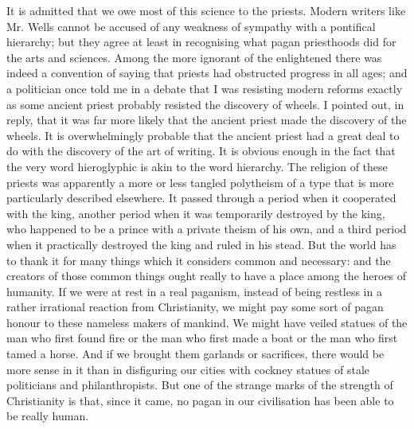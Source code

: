 It is admitted that we owe most of this science to the priests. Modern writers like Mr. Wells cannot be accused of any weakness of sympathy with a pontifical hierarchy; but they agree at least in recognising what pagan priesthoods did for the arts and sciences. Among the more ignorant of the enlightened there was indeed a convention of saying that priests had obstructed progress in all ages; and a politician once told me in a debate that I was resisting modern reforms exactly as some ancient priest probably resisted the discovery of wheels. I pointed out, in reply, that it was far more likely that the ancient priest made the discovery of the wheels. It is overwhelmingly probable that the ancient priest had a great deal to do with the discovery of the art of writing. It is obvious enough in the fact that the very word hieroglyphic is akin to the word hierarchy. The religion of these priests was apparently a more or less tangled polytheism of a type that is more particularly described elsewhere. It passed through a period when it cooperated with the king, another period when it was temporarily destroyed by the king, who happened to be a prince with a private theism of his own, and a third period when it practically destroyed the king and ruled in his stead. But the world has to thank it for many things which it considers common and necessary: and the creators of those common things ought really to have a place among the heroes of humanity. If we were at rest in a real paganism, instead of being restless in a rather irrational reaction from Christianity, we might pay some sort of pagan honour to these nameless makers of mankind. We might have veiled statues of the man who first found fire or the man who first made a boat or the man who first tamed a horse. And if we brought them garlands or sacrifices, there would be more sense in it than in disfiguring our cities with cockney statues of stale politicians and philanthropists. But one of the strange marks of the strength of Christianity is that, since it came, no pagan in our civilisation has been able to be really human.

